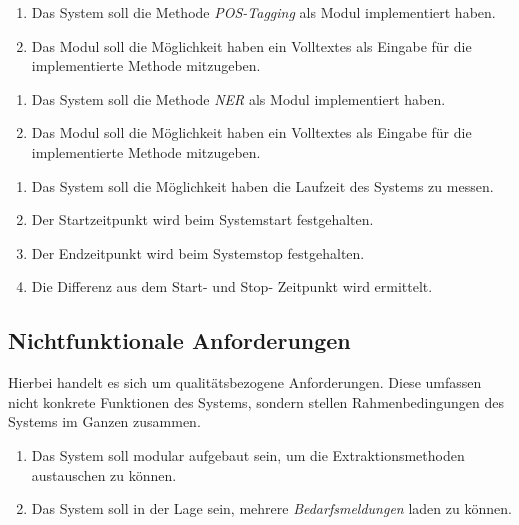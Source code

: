 \begin{enumerate}[label=7.\arabic*]
	\item Das System soll die Methode \emph{POS-Tagging} als Modul implementiert haben.
	\item Das Modul soll die Möglichkeit haben ein Volltextes als Eingabe für die implementierte Methode mitzugeben.
\end{enumerate}
\begin{enumerate}[label=8.\arabic*]
	\item Das System soll die Methode \emph{NER} als Modul implementiert haben.
	\item Das Modul soll die Möglichkeit haben ein Volltextes als Eingabe für die implementierte Methode mitzugeben.
\end{enumerate}
\begin{enumerate}[label=8.\arabic*]
	\item Das System soll die Möglichkeit haben die Laufzeit des Systems zu messen.
	\item Der Startzeitpunkt wird beim Systemstart festgehalten.
	\item Der Endzeitpunkt wird beim Systemstop festgehalten.
	\item Die Differenz aus dem Start- und Stop- Zeitpunkt wird ermittelt.
\end{enumerate}
\subsection{Nichtfunktionale Anforderungen}
Hierbei handelt es sich um qualitätsbezogene Anforderungen. Diese umfassen nicht konkrete Funktionen des Systems, sondern stellen Rahmenbedingungen des Systems im Ganzen zusammen.
\begin{enumerate}
	\item Das System soll modular aufgebaut sein, um die Extraktionsmethoden austauschen zu können.
	\item Das System soll in der Lage sein, mehrere \emph{Bedarfsmeldungen} laden zu können.
\end{enumerate}
\newpage

